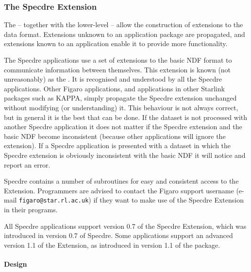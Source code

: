 
\subsubsection{\label{specextens}The Specdre Extension}

   The
   -- together with the lower-level
   -- allow the construction of extensions to the data format.
   Extensions unknown to an application package are propagated, and
   extensions known to an application enable it to provide more
   functionality.

   The Specdre applications use a set of extensions to the basic NDF
   format to communicate information between themselves.  This
   extension is known (not unreasonably) as the .  It is recognised and understood by all the
   Specdre applications.  Other Figaro applications, and applications
   in other Starlink packages such as KAPPA, simply propagate the
   Specdre extension unchanged without modifying (or understanding) it.
   This behaviour is not always correct, but in general it is the best
   that can be done.  If the dataset is not processed with another
   Specdre application it does not matter if the Specdre extension and
   the basic NDF become inconsistent (because other applications will
   ignore the extension).  If a Specdre application is presented with
   a dataset in which the Specdre extension is obviously inconsistent
   with the basic NDF it will notice and report an error.

   Specdre contains a number of subroutines for easy and consistent
   access to the Extension. Programmers are advised to contact the
   Figaro support username (e-mail {\tt figaro@star.rl.ac.uk}) if they want
   to make use of the Specdre Extension in their programs.

   All Specdre applications support version 0.7 of the Specdre
   Extension, which was introduced in version 0.7 of Specdre. Some
   applications support an advanced version 1.1 of the Extension, as
   introduced in version 1.1 of the package.


\paragraph{Design}

